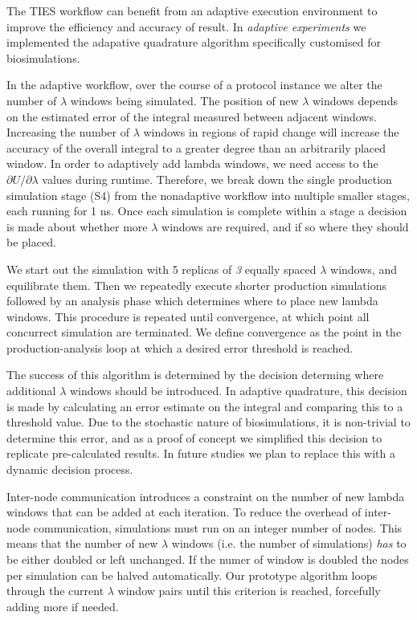 The TIES workflow can benefit from an adaptive execution environment to improve
the efficiency and accuracy of result. In \emph{adaptive experiments} we
implemented the adapative quadrature algorithm specifically customised for
biosimulations.

In the adaptive workflow, over the course of a protocol instance we alter
the number of $\lambda$ windows being simulated. The position of new $\lambda$
windows depends on the estimated error of the integral measured between
adjacent windows. Increasing the number of $\lambda$ windows in regions of
rapid change will increase the accuracy of the overall integral to a greater
degree than an
arbitrarily placed window. In order to adaptively add lambda windows, we need
access to the $\partial U/\partial\lambda$ values during runtime. Therefore, we break down the
single production simulation stage (S4) from the nonadaptive workflow into
multiple smaller stages, each running for 1 ns. Once each simulation is
complete within a stage a decision is made about whether more $\lambda$ windows
are required, and if so where they should be placed.

We start out the simulation with 5 replicas of \emph{3} equally spaced
$\lambda$ windows, and equilibrate them.
Then we repeatedly execute
shorter production simulations followed by an analysis phase which determines where to
place new lambda windows.
This procedure is repeated until convergence, at which point all
concurrect simulation are terminated.
We define convergence as the point in
the production-analysis loop at which a desired error threshold is
reached.

The success of this algorithm is determined by the decision determing
where additional $\lambda$ windows should be introduced.
In adaptive quadrature, this decision is made by
calculating an error estimate on the integral and comparing this to a threshold value.
Due to the stochastic nature of biosimulations, it is
non-trivial to determine this error, and as a proof of concept we simplified
this decision to replicate pre-calculated results. In future studies we plan
to replace this with a dynamic decision process.

Inter-node communication introduces a constraint on the number of new lambda windows that can be added at each iteration.
To reduce the overhead of inter-node communication, simulations must run on an integer number of nodes. This means that the
number of new $\lambda$ windows (i.e. the number of simulations) \emph{has} to be
either doubled or left unchanged.
If the numer of window is doubled the nodes per simulation can be halved automatically.
Our prototype algorithm loops through the current $\lambda$ window pairs until this criterion is reached, forcefully adding more if needed.


